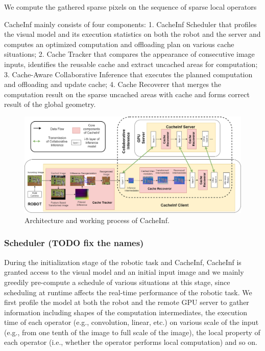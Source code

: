 We compute the gathered sparse pixels on the sequence of sparse local operators


CacheInf mainly consists of four components: 1. CacheInf Scheduler that profiles the visual model and its execution statistics on both the robot and the server and computes an optimized computation and offloading plan on various cache situations; 
2. Cache Tracker that compares the appearance of consecutive image inputs, identifies the reusable cache and extract uncached areas for computation;
3. Cache-Aware Collaborative Inference that executes the planned computation and offloading and update cache;
4. Cache Recoverer that merges the computation result on the sparse uncached areas with cache and forms correct result of the global geometry.


\begin{figure}[!htb]
    \centering
    \includegraphics[width=\linewidth]{fig/overview.png}
    \caption[track]{Architecture and working process of CacheInf.}
    \label{fig:overview}
\end{figure}

\subsubsection{Scheduler (TODO fix the names)}
During the initialization stage of the robotic task and CacheInf, CacheInf is granted access to the visual model and an initial input image and we mainly greedily pre-compute a schedule of various situations at this stage, since scheduling at runtime affects the real-time performance of the robotic task.
We first profile the model at both the robot and the remote GPU server to gather information  including shapes of the computation intermediates, the execution time of each operator (e.g., convolution, linear, etc.) on various scale of the input (e.g., from one tenth of the image to full scale of the image), the local property of each operator (i.e., whether the operator performs local computation) and so on.

